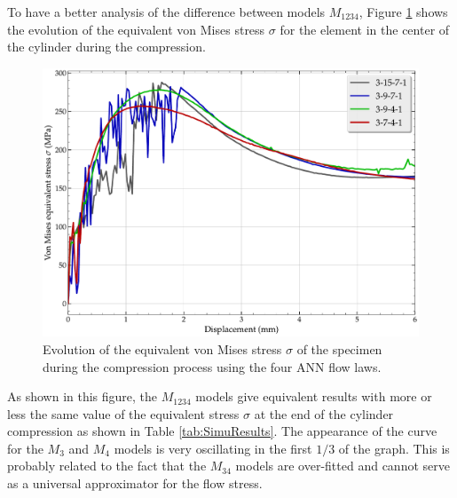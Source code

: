 \documentclass[algorithms,article,submit,pdftex,moreauthors]{Definitions/mdpi}
\begin{document}
To have a better analysis of the difference between models $M_{1234}$, Figure \ref{fig:misesCurve} shows the evolution of the equivalent von Mises stress $\sigma$ for the element in the center of the cylinder during the compression.
\begin{figure}[!ht]
\centering
\includegraphics[width=0.75\columnwidth]{Figures/vonMisesCurve}
\caption{Evolution of the equivalent von Mises stress $\sigma$ of the specimen during the compression process using the four ANN flow laws.}
\label{fig:misesCurve}
\end{figure}
As shown in this figure, the $M_{1234}$ models give equivalent results with more or less the same value of the equivalent stress $\sigma$ at the end of the cylinder compression as shown in Table \ref{tab:SimuResults}.
The appearance of the curve for the $M_3$ and $M_4$ models is very oscillating in the first $1/3$ of the graph.
This is probably related to the fact that the $M_{34}$ models are over-fitted and cannot serve as a universal approximator for the flow stress.
\end{document}
